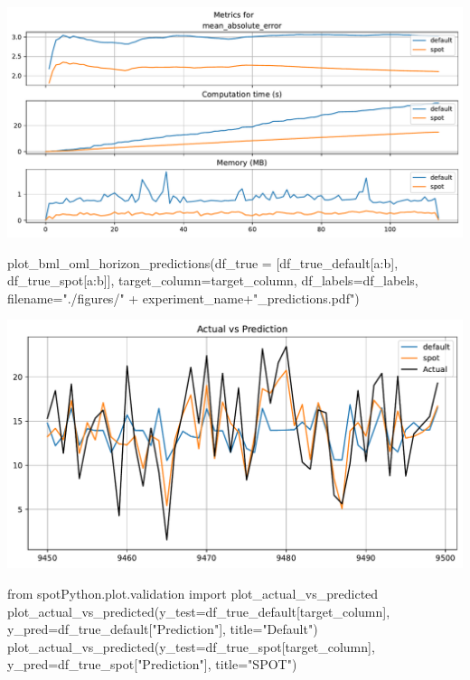 \documentclass[
  letterpaper,
  DIV=11,
  numbers=noendperiod]{scrreprt}
\newenvironment{Shaded}{\begin{snugshade}}{\end{snugshade}}
\newcommand{\ImportTok}[1]{\textcolor[rgb]{0.00,0.46,0.62}{#1}}
\newcommand{\NormalTok}[1]{\textcolor[rgb]{0.00,0.23,0.31}{#1}}
\newcommand{\OperatorTok}[1]{\textcolor[rgb]{0.37,0.37,0.37}{#1}}
\newcommand{\StringTok}[1]{\textcolor[rgb]{0.13,0.47,0.30}{#1}}
\begin{document}
\includegraphics{024_spot_hpt_river_friedman_hatr_files/figure-pdf/cell-32-output-1.pdf}

\begin{Shaded}
\begin{Highlighting}[]
\NormalTok{plot\_bml\_oml\_horizon\_predictions(df\_true }\OperatorTok{=}\NormalTok{ [df\_true\_default[a:b], df\_true\_spot[a:b]], target\_column}\OperatorTok{=}\NormalTok{target\_column,  df\_labels}\OperatorTok{=}\NormalTok{df\_labels, filename}\OperatorTok{=}\StringTok{"./figures/"} \OperatorTok{+}\NormalTok{ experiment\_name}\OperatorTok{+}\StringTok{"\_predictions.pdf"}\NormalTok{)}
\end{Highlighting}
\end{Shaded}

\includegraphics{024_spot_hpt_river_friedman_hatr_files/figure-pdf/cell-33-output-1.pdf}

\begin{Shaded}
\begin{Highlighting}[]
\ImportTok{from}\NormalTok{ spotPython.plot.validation }\ImportTok{import}\NormalTok{ plot\_actual\_vs\_predicted}
\NormalTok{plot\_actual\_vs\_predicted(y\_test}\OperatorTok{=}\NormalTok{df\_true\_default[target\_column], y\_pred}\OperatorTok{=}\NormalTok{df\_true\_default[}\StringTok{"Prediction"}\NormalTok{], title}\OperatorTok{=}\StringTok{"Default"}\NormalTok{)}
\NormalTok{plot\_actual\_vs\_predicted(y\_test}\OperatorTok{=}\NormalTok{df\_true\_spot[target\_column], y\_pred}\OperatorTok{=}\NormalTok{df\_true\_spot[}\StringTok{"Prediction"}\NormalTok{], title}\OperatorTok{=}\StringTok{"SPOT"}\NormalTok{)}
\end{Highlighting}
\end{Shaded}
\end{document}
